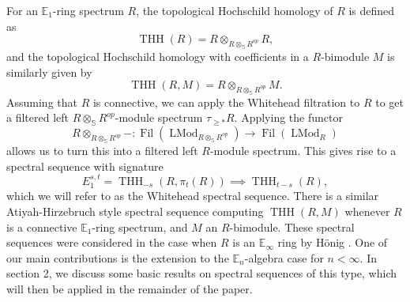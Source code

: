 \documentclass[11pt,leqno]{article}
\newcommand{\sss}{\mathbb{S}}
\newcommand{\bb}[1]{\mathbb{#1}}
\DeclareMathOperator{\THH}{THH}
\DeclareMathOperator{\LMod}{LMod}
\DeclareMathOperator{\Fil}{Fil}
\newtheorem*{short hand}{theorem name}
\theoremstyle{plain}  %
\theoremstyle{definition}
\numberwithin{equation}{section}
\begin{document}
	For an $\bb{E}_1$-ring spectrum $R$, the topological Hochschild homology of $R$ is defined as $$\THH(R)=R\otimes_{R\otimes_{\sss}R^{op}}R,$$ and the topological Hochschild homology with coefficients in a $R$-bimodule $M$ is similarly given by $$\THH(R,M)=R\otimes_{R\otimes_{\sss}R^{op}}M.$$  Assuming that $R$ is connective, we can apply the Whitehead filtration to $R$ to get a filtered left $R\otimes_{\sss}R^{op}$-module spectrum $\tau_{\geq *}R$.  Applying the functor $$R\otimes_{R\otimes_{\sss}R^{op}}-:\Fil(\LMod_{R\otimes_{\sss}R^{op}})\to\Fil( \LMod_{R})$$ allows us to turn this into a filtered left $R$-module spectrum.  This gives rise to a spectral sequence with signature
	 $$E_1^{s,t}=\THH_{-s}(R,\pi_{t}(R))\implies \THH_{t-s}(R),$$ which we will refer to as the Whitehead spectral sequence.  There is a similar Atiyah-Hirzebruch style spectral sequence computing $\THH(R,M)$ whenever $R$ is a connective $\bb{E}_1$-ring spectrum, and $M$ an $R$-bimodule.  These spectral sequences were considered in the case when $R$ is an $\bb{E}_{\infty}$ ring by H\"{o}nig \cite{H2020}.  One of our main contributions is the extension to the $\bb{E}_n$-algebra case for $n<\infty$.  In section 2, we discuss some basic results on spectral sequences of this type, which will then be applied in the remainder of the paper.
	 
\end{document}

